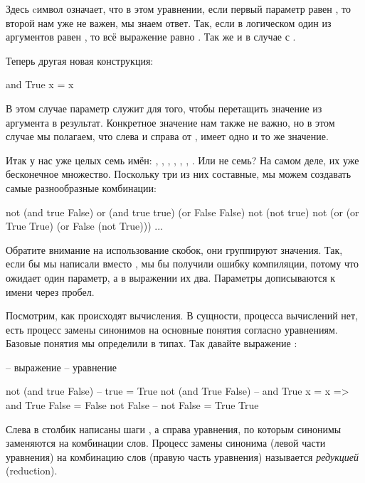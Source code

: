 Здесь cимвол \In{_} означает, что в этом уравнении, 
если первый параметр равен , то второй нам уже 
не важен, мы знаем ответ. Так, если в логическом 
один из аргументов равен , то всё выражение
равно . Так же и в случае с .

Теперь другая новая конструкция:

\begin{code}
and True   x  = x
\end{code}

В этом случае параметр  служит для того, чтобы 
перетащить значение из аргумента в результат. 
Конкретное значение нам также не важно, но в этом
случае мы полагаем, что слева и справа от \In{=},
 имеет одно и то же значение.

Итак у нас уже целых семь имён: , ,
, , , , . Или не семь? 
На самом деле, их уже бесконечное множество. Поскольку
три из них составные, мы можем создавать самые разнообразные 
комбинации:

\begin{code}
not (and true False)
or (and true true) (or False False)
not (not true)
not (or (or True True) (or False (not True)))
...
\end{code}

Обратите внимание на использование скобок, они группируют 
значения. Так, если бы мы написали  вместо
, мы бы получили ошибку компиляции, потому
что  ожидает один параметр, а в выражении 
их два. Параметры дописываются к имени через пробел.

Посмотрим, как происходят вычисления. В сущности, 
процесса вычислений нет, есть процесс замены синонимов
на основные понятия согласно уравнениям. Базовые понятия мы 
определили в типах. 
Так давайте  выражение :

\begin{code}
-- выражение            --  уравнение

not (and true False)    --  true        = True
not (and True False)    --  and True  x = x     => and True False = False
not False               --  not False   = True
True
\end{code}

Слева в столбик написаны шаги , а справа уравнения, по которым синонимы заменяются на комбинации
слов. Процесс замены синонима (левой части уравнения) на
комбинацию слов (правую часть уравнения) называется 
 \emph{редукцией}
(reduction). 

